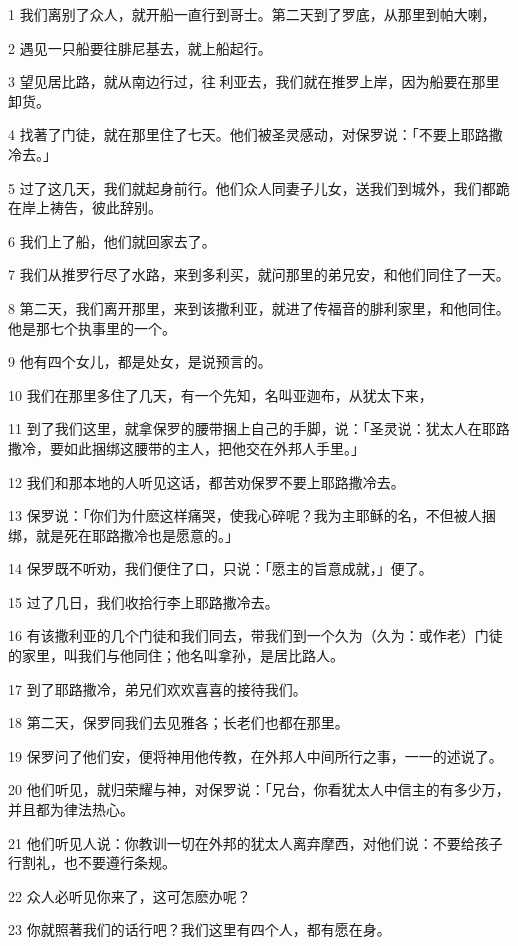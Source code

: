 \par 1 我们离别了众人，就开船一直行到哥士。第二天到了罗底，从那里到帕大喇，
\par 2 遇见一只船要往腓尼基去，就上船起行。
\par 3 望见居比路，就从南边行过，往利亚去，我们就在推罗上岸，因为船要在那里卸货。
\par 4 找著了门徒，就在那里住了七天。他们被圣灵感动，对保罗说：「不要上耶路撒冷去。」
\par 5 过了这几天，我们就起身前行。他们众人同妻子儿女，送我们到城外，我们都跪在岸上祷告，彼此辞别。
\par 6 我们上了船，他们就回家去了。
\par 7 我们从推罗行尽了水路，来到多利买，就问那里的弟兄安，和他们同住了一天。
\par 8 第二天，我们离开那里，来到该撒利亚，就进了传福音的腓利家里，和他同住。他是那七个执事里的一个。
\par 9 他有四个女儿，都是处女，是说预言的。
\par 10 我们在那里多住了几天，有一个先知，名叫亚迦布，从犹太下来，
\par 11 到了我们这里，就拿保罗的腰带捆上自己的手脚，说：「圣灵说：犹太人在耶路撒冷，要如此捆绑这腰带的主人，把他交在外邦人手里。」
\par 12 我们和那本地的人听见这话，都苦劝保罗不要上耶路撒冷去。
\par 13 保罗说：「你们为什麽这样痛哭，使我心碎呢？我为主耶稣的名，不但被人捆绑，就是死在耶路撒冷也是愿意的。」
\par 14 保罗既不听劝，我们便住了口，只说：「愿主的旨意成就，」便了。
\par 15 过了几日，我们收拾行李上耶路撒冷去。
\par 16 有该撒利亚的几个门徒和我们同去，带我们到一个久为（久为：或作老）门徒的家里，叫我们与他同住；他名叫拿孙，是居比路人。
\par 17 到了耶路撒冷，弟兄们欢欢喜喜的接待我们。
\par 18 第二天，保罗同我们去见雅各；长老们也都在那里。
\par 19 保罗问了他们安，便将神用他传教，在外邦人中间所行之事，一一的述说了。
\par 20 他们听见，就归荣耀与神，对保罗说：「兄台，你看犹太人中信主的有多少万，并且都为律法热心。
\par 21 他们听见人说：你教训一切在外邦的犹太人离弃摩西，对他们说：不要给孩子行割礼，也不要遵行条规。
\par 22 众人必听见你来了，这可怎麽办呢？
\par 23 你就照著我们的话行吧？我们这里有四个人，都有愿在身。
